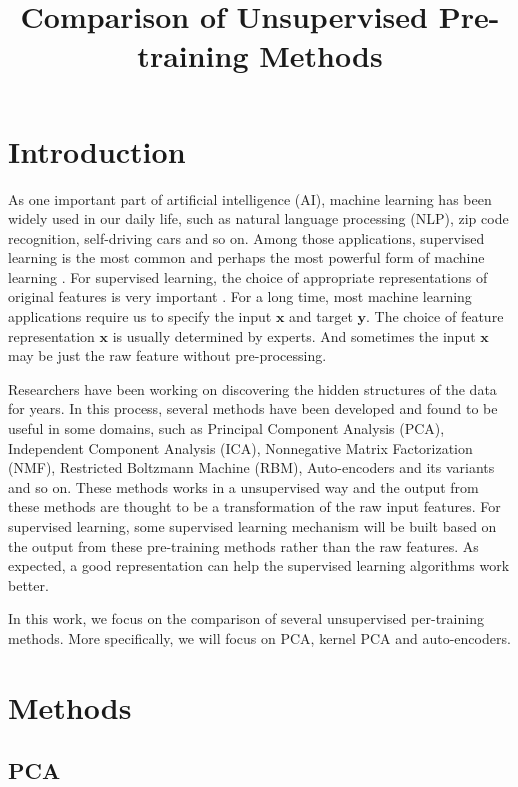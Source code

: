 \documentclass{article}
\title{Comparison of Unsupervised Pre-training Methods}
\begin{document}
%
\maketitle

\section{Introduction}
\label{sec:intro}

As one important part of artificial intelligence (AI), machine learning has been widely used in our daily life, such as natural language processing (NLP), zip code recognition, self-driving cars and so on. Among those applications, supervised learning is the most common and perhaps the most powerful form of machine learning \cite{lecun2015deep}. For supervised learning, the choice of appropriate representations of original features is very important \cite{bengio2012deep}. For a long time, most machine learning applications require us to specify the input $\pmb{x}$ and target $\pmb{y}$. The choice of feature representation $\pmb{x}$ is usually determined by experts. And sometimes the input $\pmb{x}$ may be just the raw feature without pre-processing. 

Researchers have been working on discovering the hidden structures of the data for years. In this process, several methods have been developed and found to be useful in some domains, such as Principal Component Analysis (PCA), Independent Component Analysis (ICA), Nonnegative Matrix Factorization (NMF), Restricted Boltzmann Machine (RBM), Auto-encoders and its variants and so on. These methods works in a unsupervised way and the output from these methods are thought to be a transformation of the raw input features. For supervised learning, some supervised learning mechanism will be built based on the output from these pre-training methods rather than the raw features. As expected, a good representation can help the supervised learning algorithms work better.

In this work, we focus on the comparison of several unsupervised per-training methods. More specifically, we will focus on PCA, kernel PCA and auto-encoders.

\section{Methods}
\label{sec:method}

\subsection{PCA}
\end{document}
